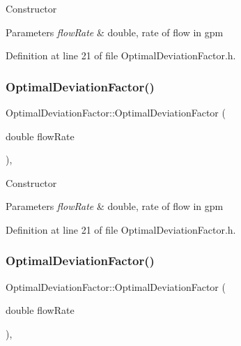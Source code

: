 Constructor 
\begin{DoxyParams}{Parameters}
{\em flow\+Rate} & double, rate of flow in gpm \\
\hline
\end{DoxyParams}


Definition at line 21 of file Optimal\+Deviation\+Factor.\+h.

\mbox{\label{class_optimal_deviation_factor_a61e6acfd31d44bc1f2f622407ba1e857}} 
\subsubsection{\texorpdfstring{Optimal\+Deviation\+Factor()}{OptimalDeviationFactor()}\hspace{0.1cm}{\footnotesize\ttfamily [2/3]}}
{\footnotesize\ttfamily Optimal\+Deviation\+Factor\+::\+Optimal\+Deviation\+Factor (\begin{DoxyParamCaption}\item[{double}]{flow\+Rate }\end{DoxyParamCaption})\hspace{0.3cm}{\ttfamily [inline]}, {\ttfamily [explicit]}}

Constructor 
\begin{DoxyParams}{Parameters}
{\em flow\+Rate} & double, rate of flow in gpm \\
\hline
\end{DoxyParams}


Definition at line 21 of file Optimal\+Deviation\+Factor.\+h.

\mbox{\label{class_optimal_deviation_factor_a61e6acfd31d44bc1f2f622407ba1e857}} 
\subsubsection{\texorpdfstring{Optimal\+Deviation\+Factor()}{OptimalDeviationFactor()}\hspace{0.1cm}{\footnotesize\ttfamily [3/3]}}
{\footnotesize\ttfamily Optimal\+Deviation\+Factor\+::\+Optimal\+Deviation\+Factor (\begin{DoxyParamCaption}\item[{double}]{flow\+Rate }\end{DoxyParamCaption})\hspace{0.3cm}{\ttfamily [inline]}, {\ttfamily [explicit]}}

